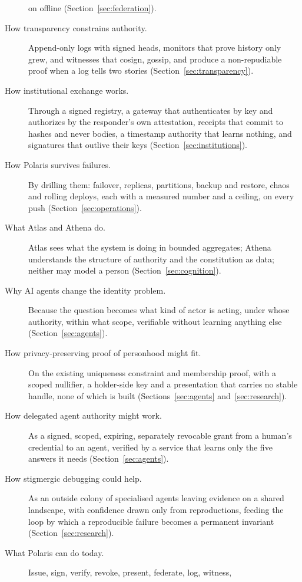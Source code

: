 \begin{description}
    on offline (Section~\ref{sec:federation}).
  \item[How transparency constrains authority.] Append-only logs with signed heads, monitors that
    prove history only grew, and witnesses that cosign, gossip, and produce a non-repudiable proof
    when a log tells two stories (Section~\ref{sec:transparency}).
  \item[How institutional exchange works.] Through a signed registry, a gateway that authenticates
    by key and authorizes by the responder's own attestation, receipts that commit to hashes and never
    bodies, a timestamp authority that learns nothing, and signatures that outlive their keys
    (Section~\ref{sec:institutions}).
  \item[How Polaris survives failures.] By drilling them: failover, replicas, partitions, backup
    and restore, chaos and rolling deploys, each with a measured number and a ceiling, on every push
    (Section~\ref{sec:operations}).
  \item[What Atlas and Athena do.] Atlas sees what the system is doing in bounded aggregates;
    Athena understands the structure of authority and the constitution as data; neither may model a
    person (Section~\ref{sec:cognition}).
  \item[Why AI agents change the identity problem.] Because the question becomes what kind of actor
    is acting, under whose authority, within what scope, verifiable without learning anything else
    (Section~\ref{sec:agents}).
  \item[How privacy-preserving proof of personhood might fit.] On the existing uniqueness constraint
    and membership proof, with a scoped nullifier, a holder-side key and a presentation that carries no
    stable handle, none of which is built (Sections~\ref{sec:agents} and~\ref{sec:research}).
  \item[How delegated agent authority might work.] As a signed, scoped, expiring, separately revocable
    grant from a human's credential to an agent, verified by a service that learns only the five
    answers it needs (Section~\ref{sec:agents}).
  \item[How stigmergic debugging could help.] As an outside colony of specialised agents leaving
    evidence on a shared landscape, with confidence drawn only from reproductions, feeding the loop by
    which a reproducible failure becomes a permanent invariant (Section~\ref{sec:research}).
  \item[What Polaris can do today.] Issue, sign, verify, revoke, present, federate, log, witness,

\end{description}
